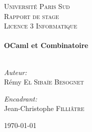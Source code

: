 \begin{titlepage}

\begin{center}



\textsc{\LARGE Université Paris Sud}\\[1.5cm]

\textsc{\Large Rapport de stage}\\[0.5cm]

\textsc{\Large Licence 3 Informatique}\\[0.5cm]

\HRule \\[0.4cm]
{ \huge \bfseries OCaml et Combinatoire}\\[0.4cm]

\HRule \\[1.5cm]

\begin{minipage}{0.4\textwidth}
\begin{flushleft} \large
\emph{Auteur:}\\
Rémy \textsc{El Sibaïe Besognet}
\end{flushleft}
\end{minipage}
\begin{minipage}{0.4\textwidth}
\begin{flushright} \large
\emph{Encadrant:} \\
Jean-Christophe \textsc{Filliâtre}
\end{flushright}
\end{minipage}

\vfill

{\large \today}

\end{center}

\end{titlepage}

